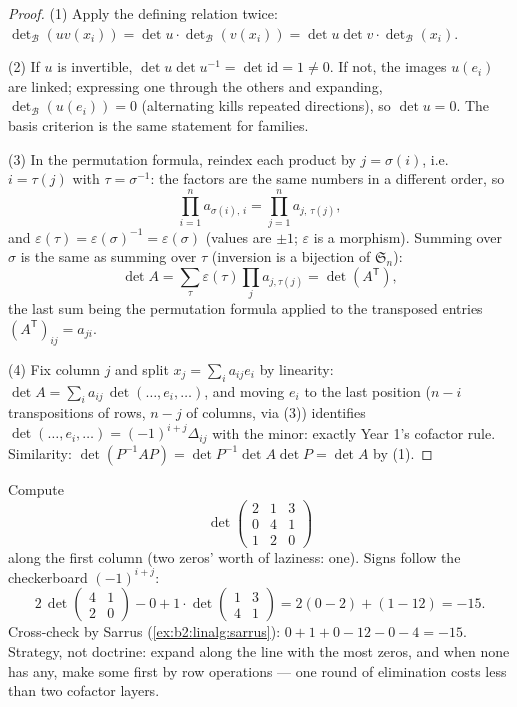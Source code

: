 \begin{proof}
(1) Apply the defining relation twice:
$\det_{\mathcal B}(uv(x_i)) = \det u \cdot \det_{\mathcal
B}(v(x_i)) = \det u \det v \cdot \det_{\mathcal B}(x_i)$.

(2) If $u$ is invertible, $\det u \det u^{-1} = \det \mathrm{id} =
1 \neq 0$. If not, the images $u(e_i)$ are linked; expressing one
through the others and expanding, $\det_{\mathcal B}(u(e_i)) = 0$
(alternating kills repeated directions), so $\det u = 0$. The basis
criterion is the same statement for families.

(3) In the permutation formula, reindex each product by $j =
\sigma(i)$, i.e.\ $i = \tau(j)$ with $\tau = \sigma^{-1}$: the
factors are the same numbers in a different order, so
\[
\prod_{i=1}^{n} a_{\sigma(i),\,i} = \prod_{j=1}^{n}
a_{j,\,\tau(j)} ,
\]
and $\varepsilon(\tau) = \varepsilon(\sigma)^{-1} =
\varepsilon(\sigma)$ (values are $\pm1$; $\varepsilon$ is a
morphism). Summing over $\sigma$ is the same as summing over
$\tau$ (inversion is a bijection of $\mathfrak{S}_n$):
\[
\det A = \sum_{\tau}\varepsilon(\tau)\prod_j a_{j,\tau(j)}
= \det(A^{\mathsf T}),
\]
the last sum being the permutation formula applied to the
transposed entries $(A^{\mathsf T})_{ij} = a_{ji}$.

(4) Fix column $j$ and split $x_j = \sum_i a_{ij} e_i$ by
linearity: $\det A = \sum_i a_{ij}\, \det(\dots, e_i, \dots)$, and
moving $e_i$ to the last position ($n - i$ transpositions of rows,
$n - j$ of columns, via (3)) identifies $\det(\dots, e_i, \dots) =
(-1)^{i+j}\Delta_{ij}$ with the minor: exactly Year 1's cofactor
rule. Similarity: $\det(P^{-1}AP) = \det P^{-1}\det A \det P =
\det A$ by (1).
\end{proof}

\begin{example}\label{ex:b2:linalg:cofactorwork}
Compute
\[
\det\begin{pmatrix}
2 & 1 & 3\\
0 & 4 & 1\\
1 & 2 & 0
\end{pmatrix}
\]
along the first column (two zeros' worth of laziness: one).
Signs follow the checkerboard $(-1)^{i+j}$:
\[
2\,\det\begin{pmatrix}4 & 1\\ 2 & 0\end{pmatrix}
- 0
+ 1\cdot\det\begin{pmatrix}1 & 3\\ 4 & 1\end{pmatrix}
= 2(0 - 2) + (1 - 12) = -15 .
\]
Cross-check by Sarrus (\cref{ex:b2:linalg:sarrus}): $0 + 1 + 0
- 12 - 0 - 4 = -15$. Strategy, not doctrine: expand along the
line with the most zeros, and when none has any, make some
first by row operations --- one round of elimination costs
less than two cofactor layers.
\end{example}

